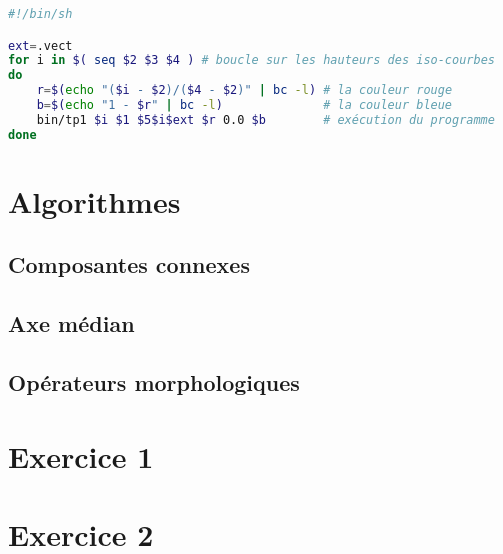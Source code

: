\documentclass[11pt,a4paper]{article}
\begin{document}
  \begin{lstlisting}[language=bash]
#!/bin/sh

ext=.vect
for i in $( seq $2 $3 $4 ) # boucle sur les hauteurs des iso-courbes
do
	r=$(echo "($i - $2)/($4 - $2)" | bc -l) # la couleur rouge
	b=$(echo "1 - $r" | bc -l)              # la couleur bleue
	bin/tp1 $i $1 $5$i$ext $r 0.0 $b        # exécution du programme
done

  \end{lstlisting}


  \section{Algorithmes}
  \subsection{Composantes connexes}

  \subsection{Axe médian}

  \subsection{Opérateurs morphologiques}


  \section{Exercice 1}

  \pagebreak
  \section{Exercice 2}
\end{document}
